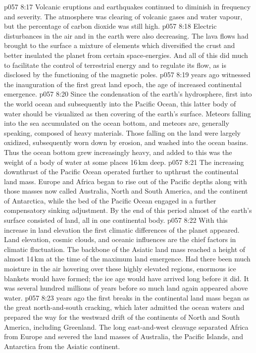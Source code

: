 \vs p057 8:17 Volcanic eruptions and earthquakes continued to diminish in frequency and severity. The atmosphere was clearing of volcanic gases and water vapour, but the percentage of carbon dioxide was still high.
\vs p057 8:18 Electric disturbances in the air and in the earth were also decreasing. The lava flows had brought to the surface a mixture of elements which diversified the crust and better insulated the planet from certain space\hyp{}energies. And all of this did much to facilitate the control of terrestrial energy and to regulate its flow, as is disclosed by the functioning of the magnetic poles.
\vs p057 8:19 \pc {} years ago witnessed the inauguration of the first great land epoch, the age of increased continental emergence.
\vs p057 8:20 Since the condensation of the earth’s hydrosphere, first into the world ocean and subsequently into the Pacific Ocean, this latter body of water should be visualized as then covering  of the earth’s surface. Meteors falling into the sea accumulated on the ocean bottom, and meteors are, generally speaking, composed of heavy materials. Those falling on the land were largely oxidized, subsequently worn down by erosion, and washed into the ocean basins. Thus the ocean bottom grew increasingly heavy, and added to this was the weight of a body of water at some places 16\,km deep.
\vs p057 8:21 The increasing downthrust of the Pacific Ocean operated further to upthrust the continental land mass. Europe and Africa began to rise out of the Pacific depths along with those masses now called Australia, North and South America, and the continent of Antarctica, while the bed of the Pacific Ocean engaged in a further compensatory sinking adjustment. By the end of this period almost  of the earth’s surface consisted of land, all in one continental body.
\vs p057 8:22 With this increase in land elevation the first climatic differences of the planet appeared. Land elevation, cosmic clouds, and oceanic influences are the chief factors in climatic fluctuation. The backbone of the Asiatic land mass reached a height of almost 14\,km at the time of the maximum land emergence. Had there been much moisture in the air hovering over these highly elevated regions, enormous ice blankets would have formed; the ice age would have arrived long before it did. It was several hundred millions of years before so much land again appeared above water.
\vs p057 8:23 \pc {} years ago the first breaks in the continental land mass began as the great north\hyp{}and\hyp{}south cracking, which later admitted the ocean waters and prepared the way for the westward drift of the continents of North and South America, including Greenland. The long east\hyp{}and\hyp{}west cleavage separated Africa from Europe and severed the land masses of Australia, the Pacific Islands, and Antarctica from the Asiatic continent.
